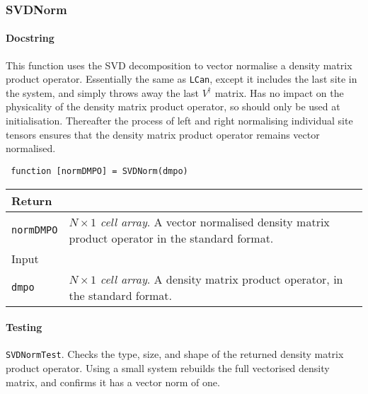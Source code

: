  \subsubsection{SVDNorm}
 \paragraph{Docstring} This function uses the SVD decomposition to vector normalise a density matrix product operator. Essentially the same as \lstinline$LCan$, except it includes the last site in the system, and simply throws away the last \(V^{\dagger}\) matrix. Has no impact on the physicality of the density matrix product operator, so should only be used at initialisation. Thereafter the process of left and right normalising individual site tensors ensures that the density matrix product operator remains vector normalised. 
 \begin{lstlisting}
 function [normDMPO] = SVDNorm(dmpo) \end{lstlisting}
 \begin{longtabu}{X[1,l]X[4,l]}
 \hline
 Return & \\ \hline
 \lstinline$normDMPO$ & \emph{\(N \times 1\) cell array}. A vector normalised density matrix product operator in the standard format. \\ \hline
 Input & \\ \hline
 \lstinline$dmpo$ & \emph{\(N \times 1\) cell array}. A density matrix product operator, in the standard format. \\ 
 \hline
 \end{longtabu}
 \paragraph{Testing} \lstinline$SVDNormTest$. Checks the type, size, and shape of the returned density matrix product operator. Using a small system rebuilds the full vectorised density matrix, and confirms it has a vector norm of one.  